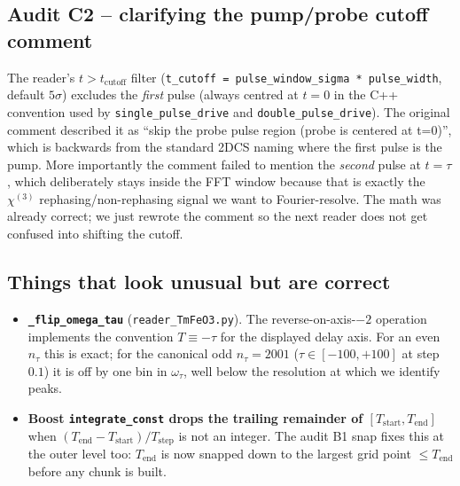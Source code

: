 \documentclass[11pt,letterpaper]{article}
\begin{document}
\subsection*{Audit C2 -- clarifying the pump/probe cutoff comment}

The reader's $t > t_\text{cutoff}$ filter (\texttt{t\_cutoff
= pulse\_window\_sigma * pulse\_width}, default $5\sigma$) excludes
the \emph{first} pulse (always centred at $t = 0$ in the C++
convention used by \texttt{single\_pulse\_drive} and
\texttt{double\_pulse\_drive}).  The original comment described it
as ``skip the probe pulse region (probe is centered at t=0)'',
which is backwards from the standard 2DCS naming where the first
pulse is the pump.  More importantly the comment failed to mention
the \emph{second} pulse at $t = \tau$, which deliberately stays
inside the FFT window because that is exactly the
$\chi^{(3)}$ rephasing/non-rephasing signal we want to Fourier-resolve.
The math was already correct; we just rewrote the comment so the
next reader does not get confused into shifting the cutoff.

\subsection*{Things that look unusual but are correct}

\begin{itemize}[noitemsep]
\item \textbf{\texttt{\_flip\_omega\_tau}} (\texttt{reader\_TmFeO3.py}).
The reverse-on-axis-$-2$ operation implements the convention
$T \equiv -\tau$ for the displayed delay axis.  For an even
$n_\tau$ this is exact; for the canonical odd
$n_\tau = 2001$ ($\tau \in [-100, +100]$ at step $0.1$) it is off
by one bin in $\omega_\tau$, well below the resolution at which we
identify peaks.

\item \textbf{Boost \texttt{integrate\_const} drops the trailing
remainder of $[T_\text{start}, T_\text{end}]$} when
$(T_\text{end} - T_\text{start})/T_\text{step}$ is not an integer.
The audit B1 snap fixes this at the outer level too: $T_\text{end}$
is now snapped down to the largest grid point $\le T_\text{end}$
before any chunk is built.
\end{itemize}

\end{document}
